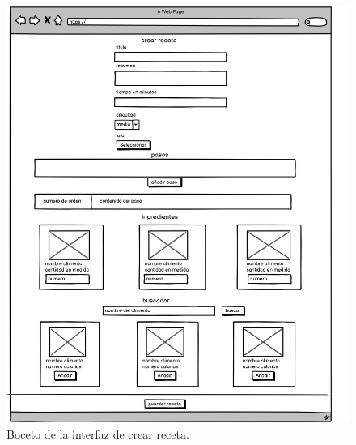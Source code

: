    

      \begin{figure}[H]
    \centering
    \includegraphics[scale=0.20]{img/crear-receta.jpg}
    \caption{Boceto de la interfaz de crear receta.}
    \label{fig:crear-receta}
\end{figure}
    
  

